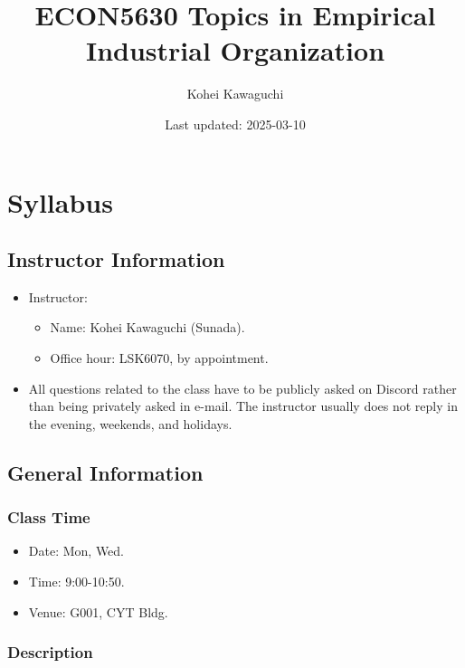 \documentclass[
]{book}
\title{ECON5630 Topics in Empirical Industrial Organization}
\author{Kohei Kawaguchi}
\date{Last updated: 2025-03-10}
\providecommand{\tightlist}{%
  \setlength{\itemsep}{0pt}\setlength{\parskip}{0pt}}
\begin{document}
\maketitle

{
\setcounter{tocdepth}{1}
\tableofcontents
}
\hypertarget{syllabus}{%
\chapter{Syllabus}\label{syllabus}}

\hypertarget{instructor-information}{%
\section{Instructor Information}\label{instructor-information}}

\begin{itemize}
\tightlist
\item
  Instructor:

  \begin{itemize}
  \tightlist
  \item
    Name: Kohei Kawaguchi (Sunada).
  \item
    Office hour: LSK6070, by appointment.
  \end{itemize}
\item
  All questions related to the class have to be publicly asked on Discord rather than being privately asked in e-mail. The instructor usually does not reply in the evening, weekends, and holidays.
\end{itemize}

\hypertarget{general-information}{%
\section{General Information}\label{general-information}}

\hypertarget{class-time}{%
\subsection{Class Time}\label{class-time}}

\begin{itemize}
\tightlist
\item
  Date: Mon, Wed.
\item
  Time: 9:00-10:50.
\item
  Venue: G001, CYT Bldg.
\end{itemize}

\hypertarget{description}{%
\subsection{Description}\label{description}}
\end{document}
